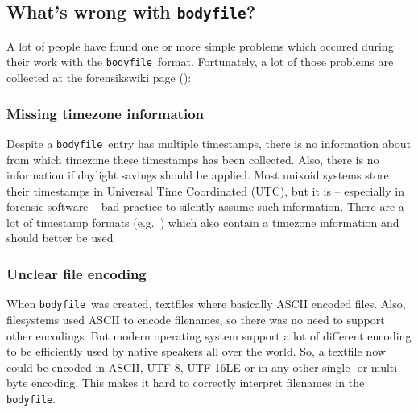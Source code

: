 \documentclass[twocolumn]{article}
\newcommand{\bodyfile}{\texttt{bodyfile}}
\begin{document}
\subsection{What's wrong with \bodyfile?}

A lot of people have found one or more simple problems which occured during their work with the \bodyfile\ format. Fortunately, a lot of those problems are collected at the forensikswiki page (\cite{bodyfile}):

\subsubsection{Missing timezone information}

Despite a \bodyfile\ entry has multiple timestamps, there is no information about from which timezone these timestamps has been collected. Also, there is no information if daylight savings should be applied. Most unixoid systems store their timestamps in Universal Time Coordinated (UTC), but it is -- especially in forensic software -- bad practice to silently assume such information. There are a lot of timestamp formats (e.g.~\cite{rfc3339}) which also contain a timezone information and should better be used

\subsubsection{Unclear file encoding}

When \bodyfile\ was created, textfiles where basically ASCII encoded files. Also, filesystems used ASCII to encode filenames, so there was no need to support other encodings. But modern operating system support a lot of different encoding to be efficiently used by native speakers all over the world. So, a textfile now could be encoded in ASCII, UTF-8, UTF-16LE or in any other single- or multi-byte encoding. This makes it hard to correctly interpret filenames in the \bodyfile.



\end{document}

